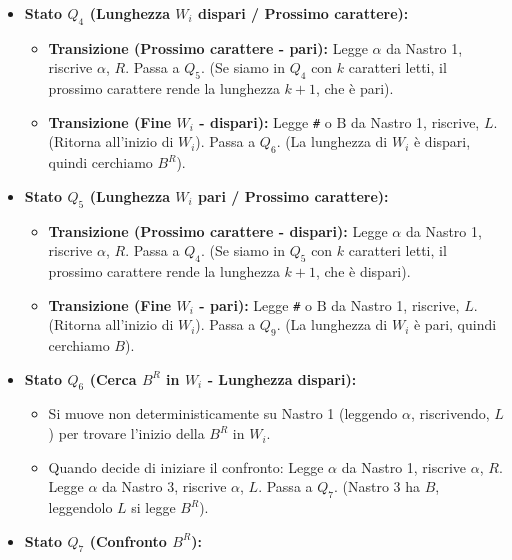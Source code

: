 \documentclass[a4paper]{article}
\newcommand{\B}{\text{B}} %
\begin{document}
\begin{itemize}
\begin{itemize}
        \end{itemize}
    \item \textbf{Stato $Q_4$ (Lunghezza $W_i$ dispari / Prossimo carattere):}
        \begin{itemize}
            \item \textbf{Transizione (Prossimo carattere - pari):}
                Legge $\alpha$ da Nastro 1, riscrive $\alpha$, $R$. Passa a $Q_5$.
                (Se siamo in $Q_4$ con $k$ caratteri letti, il prossimo carattere rende la lunghezza $k+1$, che è pari).
            \item \textbf{Transizione (Fine $W_i$ - dispari):}
                Legge \texttt{\#} o $\B$ da Nastro 1, riscrive, $L$. (Ritorna all'inizio di $W_i$).
                Passa a $Q_6$. (La lunghezza di $W_i$ è dispari, quindi cerchiamo $B^R$).
        \end{itemize}
    \item \textbf{Stato $Q_5$ (Lunghezza $W_i$ pari / Prossimo carattere):}
        \begin{itemize}
            \item \textbf{Transizione (Prossimo carattere - dispari):}
                Legge $\alpha$ da Nastro 1, riscrive $\alpha$, $R$. Passa a $Q_4$.
                (Se siamo in $Q_5$ con $k$ caratteri letti, il prossimo carattere rende la lunghezza $k+1$, che è dispari).
            \item \textbf{Transizione (Fine $W_i$ - pari):}
                Legge \texttt{\#} o $\B$ da Nastro 1, riscrive, $L$. (Ritorna all'inizio di $W_i$).
                Passa a $Q_9$. (La lunghezza di $W_i$ è pari, quindi cerchiamo $B$).
        \end{itemize}
    \item \textbf{Stato $Q_6$ (Cerca $B^R$ in $W_i$ - Lunghezza dispari):}
        \begin{itemize}
            \item Si muove non deterministicamente su Nastro 1 (leggendo $\alpha$, riscrivendo, $L$) per trovare l'inizio della $B^R$ in $W_i$.
            \item Quando decide di iniziare il confronto: Legge $\alpha$ da Nastro 1, riscrive $\alpha$, $R$. Legge $\alpha$ da Nastro 3, riscrive $\alpha$, $L$. Passa a $Q_7$.
            (Nastro 3 ha $B$, leggendolo $L$ si legge $B^R$).
        \end{itemize}
    \item \textbf{Stato $Q_7$ (Confronto $B^R$):}
        \begin{itemize}

\end{itemize}
\end{itemize}
\end{document}

